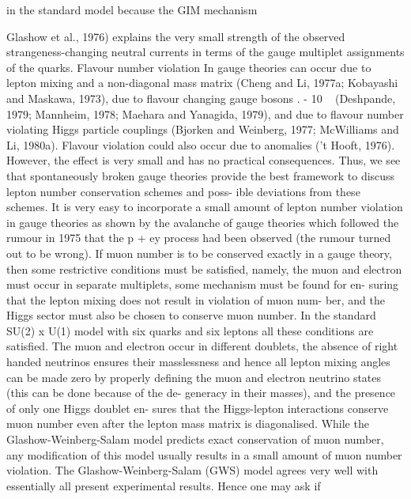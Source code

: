 \documentclass[twoside]{article}
\begin{document}
in the standard model because the GIM mechanism {Glashow et al., 1976)
explains the very small strength of the observed strangeness-changing
neutral currents in terms of the gauge multiplet assignments of the
quarks. Flavour number violation In gauge theories can occur due to
lepton mixing and a non-diagonal mass matrix (Cheng and Li, 1977a;
Kobayashi and Maskawa, 1973), due to flavour changing gauge bosons
. - 10 ~
(Deshpande, 1979; Mannheim, 1978; Maehara and Yanagida, 1979), and due
to flavour number violating Higgs particle couplings (Bjorken and
Weinberg, 1977; McWilliams and Li, 1980a). Flavour violation could also
occur due to anomalies ('t Hooft, 1976). However, the effect is very
small and has no practical consequences.
Thus, we see that spontaneously broken gauge theories provide the
best framework to discuss lepton number conservation schemes and poss-
ible deviations from these schemes. It is very easy to incorporate a
small amount of lepton number violation in gauge theories as shown by
the avalanche of gauge theories which followed the rumour in 1975 that
the p + ey process had been observed (the rumour turned out to be wrong).
If muon number is to be conserved exactly in a gauge theory, then some
restrictive conditions must be satisfied, namely, the muon and electron
must occur in separate multiplets, some mechanism must be found for en-
suring that the lepton mixing does not result in violation of muon num-
ber, and the Higgs sector must also be chosen to conserve muon number.
In the standard SU(2) x U(1) model with six quarks and six leptons all
these conditions are satisfied. The muon and electron occur in different
doublets, the absence of right handed neutrinos ensures their masslessness
and hence all lepton mixing angles can be made zero by properly defining
the muon and electron neutrino states (this can be done because of the de-
generacy in their masses), and the presence of only one Higgs doublet en-
sures that the Higgs-lepton interactions conserve muon number even after
the lepton mass matrix is diagonalised. While the Glashow-Weinberg-Salam
model predicts exact conservation of muon number, any modification of
this model usually results in a small amount of muon number violation.
The Glashow-Weinberg-Salam (GWS) model agrees very well with
essentially all present experimental results. Hence one may ask if

}
\end{document}
